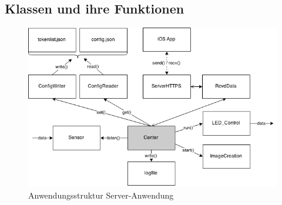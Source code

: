 
\subsection{Klassen und ihre Funktionen}

\begin{figure}[h]
	\begin{minipage}{\textwidth}
		\centering
		\includegraphics[width=\textwidth]{./data/ApplicationConcept.png}
		\caption{Anwendungsstruktur Server-Anwendung}
	\end{minipage}
\end{figure}

